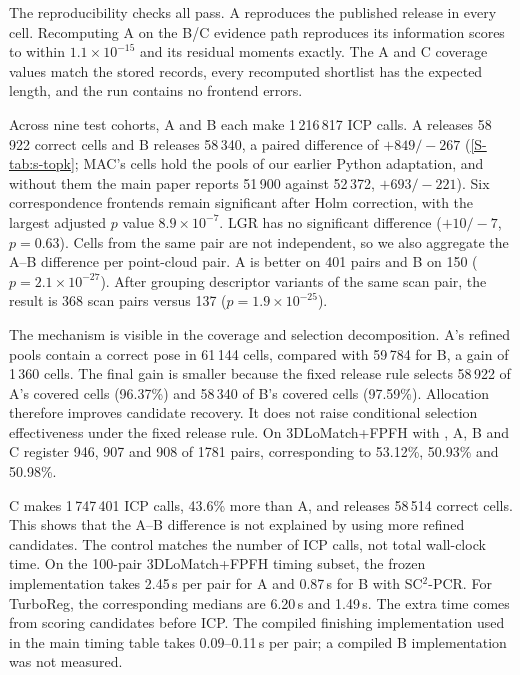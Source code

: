 The reproducibility checks all pass. A reproduces the published release in every cell. Recomputing A on the B/C evidence path reproduces its information scores to within $1.1\times10^{-15}$ and its residual moments exactly. The A and C coverage values match the stored records, every recomputed shortlist has the expected length, and the run contains no frontend errors.

Across nine test cohorts, A and B each make 1\,216\,817 ICP calls. A releases 58\,922 correct cells and B releases 58\,340, a paired difference of $+849/{-}267$ (\cref{S-tab:s-topk}; MAC's cells hold the pools of our earlier Python adaptation, and without them the main paper reports 51\,900 against 52\,372, $+693/{-}221$). Six correspondence frontends remain significant after Holm correction, with the largest adjusted $p$ value $8.9\times10^{-7}$. LGR has no significant difference ($+10/{-}7$, $p=0.63$). Cells from the same pair are not independent, so we also aggregate the A--B difference per point-cloud pair. A is better on 401 pairs and B on 150 ($p=2.1\times10^{-27}$). After grouping descriptor variants of the same scan pair, the result is 368 scan pairs versus 137 ($p=1.9\times10^{-25}$).

The mechanism is visible in the coverage and selection decomposition. A's refined pools contain a correct pose in 61\,144 cells, compared with 59\,784 for B, a gain of 1\,360 cells. The final gain is smaller because the fixed release rule selects 58\,922 of A's covered cells (96.37\%) and 58\,340 of B's covered cells (97.59\%). Allocation therefore improves candidate recovery. It does not raise conditional selection effectiveness under the fixed release rule. On 3DLoMatch+FPFH with \ls{}, A, B and C register 946, 907 and 908 of 1781 pairs, corresponding to 53.12\%, 50.93\% and 50.98\%.

C makes 1\,747\,401 ICP calls, 43.6\% more than A, and releases 58\,514 correct cells. This shows that the A--B difference is not explained by using more refined candidates. The control matches the number of ICP calls, not total wall-clock time. On the 100-pair 3DLoMatch+FPFH timing subset, the frozen implementation takes 2.45\,s per pair for A and 0.87\,s for B with SC$^2$-PCR. For TurboReg, the corresponding medians are 6.20\,s and 1.49\,s. The extra time comes from scoring candidates before ICP. The compiled finishing implementation used in the main timing table takes 0.09--0.11\,s per pair; a compiled B implementation was not measured.

\begin{table}[t]
\centering

\caption{Allocation against plain Top-K over the nine test cohorts. A is finishing's allocated pool and reproduces the published release. B is plain Top-K with A's actual ICP calls on every cell. C is the full stored Top-K bank. All arms use the same ICP and release rule. $+a/{-}b$ gives cells registered by A but not B, and vice versa. The $p$ values are exact McNemar tests with Holm correction over the seven frontends. MAC: the pools of our earlier Python adaptation, only pairs within its resource limit (\cref{S-sec:s-maccpp}).}
\label{S-tab:s-topk}
\end{table}

